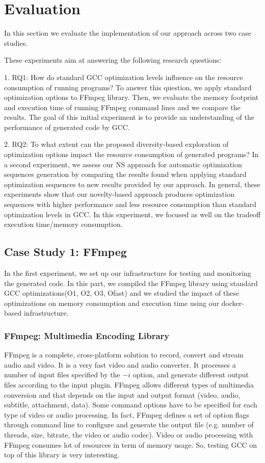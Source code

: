 \section{Evaluation}
In this section we evaluate the implementation of our
approach across two case studies. 

These experiments aim at answering the following research questions:

1. RQ1: How do standard GCC optimization levels influence
on the resource consumption of running programs?
To answer this question, we apply standard optimization options to FFmpeg library. Then, we evaluate the memory footprint and execution time of running FFmpeg command lines and we
compare the results. The goal of this initial experiment is to
provide an understanding of the performance of
generated code by GCC.

2. RQ2: To what extent can the proposed diversity-based
exploration of optimization options impact the resource
consumption of generated programs?
In a second experiment, we assess our NS
approach for automatic optimization sequences generation by
comparing the results found when applying standard optimization sequences to new
results provided by our approach. In general, these experiments
show that our novelty-based approach produces optimization
sequences with higher performance and less resource consumption
than standard optimization levels in GCC. In this experiment, we focused as well on the tradeoff execution time/memory consumption.




\subsection{Case Study 1: FFmpeg}
In the first experiment, we set up our infrastructure for testing and monitoring the generated code. In this part, we compiled the FFmpeg library using standard GCC optimizations(O1, O2, O3, Ofast) and we studied the impact of these optimizations on memory consumption and execution time using our docker-based infrastructure.

\subsubsection{FFmpeg: Multimedia Encoding Library}
FFmpeg is a complete, cross-platform solution to record, convert and stream audio and video. It is a very fast video and audio converter. It processes a number of input files specified by the $-i$ option, and generate different output files according to the input plugin. FFmpeg allows different types of multimedia conversion and that depends on the input and output format (video, audio, subtitle, attachment, data).
Some command options have to be specified for each type of video or audio processing. In fact,
FFmpeg defines a set of option flags through command line to configure and generate the output
file (e.g. number of threads, size, bitrate, the video or audio codec). Video or audio processing with FFmpeg consumes lot of resources in term of memory usage. So, testing GCC on top of this library is very interesting. 
